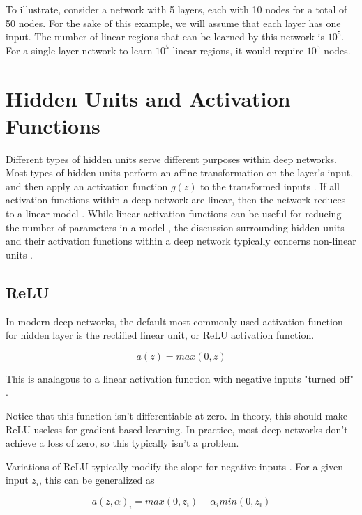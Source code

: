 \documentclass{article}
\begin{document}
To illustrate, consider a network with 5 layers, each with 10 nodes for a total of 50 nodes. For the sake of this example, we will assume that each layer has one input. The number of linear regions that can be learned by this network is \(10^5\). For a single-layer network to learn \(10^5\) linear regions, it would require \(10^5\) nodes. 

\section{Hidden Units and Activation Functions} %

Different types of hidden units serve different purposes within deep networks. Most types of hidden units perform an affine  transformation on the layer's input, and then apply an activation function \(g(z)\) to the transformed inputs \cite{Goodfellow-et-al-2016}. If all activation functions within a deep network are linear, then the network reduces to a linear model \cite{pml1book}. While linear activation functions can be useful for reducing the number of parameters in a model , the discussion surrounding hidden units and their activation functions within a deep network typically concerns non-linear units \cite{Goodfellow-et-al-2016}. 

\subsection{ReLU}

In modern deep networks, the default most commonly used activation function for hidden layer is the rectified linear unit, or ReLU activation function.

\begin{equation}
    a(z) = max(0, z)
    \label{ReLU-activation}
\end{equation}

This is analagous to a linear activation function with negative inputs "turned off" \cite{pml1book}. 

Notice that this function isn't differentiable at zero. In theory, this should make ReLU useless for gradient-based learning. In practice, most deep networks don't achieve a loss of zero, so this typically isn't a problem.

Variations of ReLU typically modify the slope for negative inputs \cite{Goodfellow-et-al-2016}. For a given input \(z_i\), this can be generalized as

\begin{equation}
    a(z,\alpha)_i = max(0, z_i) + \alpha_i min(0,z_i)
    \label{generalization-ReLU}
\end{equation}
\end{document}
